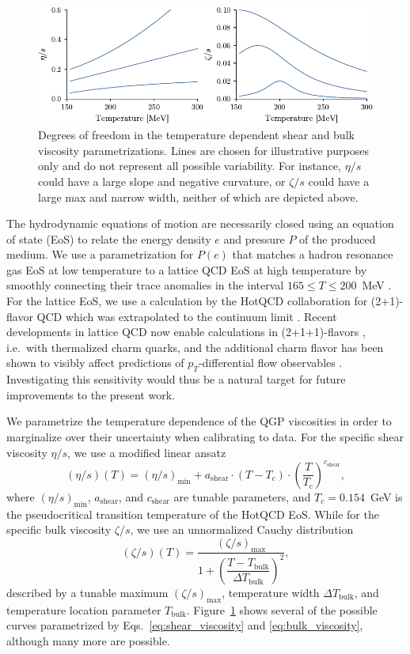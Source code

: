 \documentclass[aps,prc,reprint,amsmath,nofootinbib]{revtex4-1}
\newcommand{\smin}{{(\eta/s)_\mathrm{min}}}
\newcommand{\sslope}{{a_\mathrm{shear}}}
\newcommand{\scrv}{{c_\mathrm{shear}}}
\newcommand{\bmax}{{(\zeta/s)_\mathrm{max}}}
\newcommand{\bloc}{{T_\text{bulk}}}
\newcommand{\bwidth}{{\Delta T_\text{bulk}}}
\begin{document}
\begin{figure}[t]
  \includegraphics{viscosity_dof}
  \caption{Degrees of freedom in the temperature dependent shear and bulk viscosity parametrizations. Lines are chosen for illustrative purposes only and do not represent all possible variability. For instance, $\eta/s$ could have a large slope and negative curvature, or $\zeta/s$ could have a large max and narrow width, neither of which are depicted above.}
  \label{fig:viscosity_dof}
\end{figure}

The hydrodynamic equations of motion are necessarily closed using an equation of state (EoS) to relate the energy density $e$ and pressure $P$ of the produced medium.
We use a parametrization for $P(e)$ that matches a hadron resonance gas EoS at low temperature to a lattice QCD EoS at high temperature by smoothly connecting their trace anomalies in the interval
$165 \le T \le 200$~MeV \cite{Bernhard:2018hnz}.
For the lattice EoS, we use a calculation by the HotQCD collaboration for (2+1)-flavor QCD which was extrapolated to the continuum limit \cite{Bazavov:2014pvz}. Recent developments in lattice QCD now enable calculations in (2+1+1)-flavors \cite{Borsanyi:2016ksw}, i.e.\ with thermalized charm quarks, and the additional charm flavor has been shown to visibly affect predictions of $p_T$-differential flow observables \cite{Noronha-Hostler:2018zxc}.
Investigating this sensitivity would thus be a natural target for future improvements to the present work.

We parametrize the temperature dependence of the QGP viscosities in order to marginalize over their uncertainty when calibrating to data.
For the specific shear viscosity $\eta/s$, we use a modified linear ansatz
\begin{equation}
  \label{eq:shear_viscosity}
  (\eta/s)(T) = \smin + \sslope \cdot(T - T_c)\cdot \left ( \frac{T}{T_c} \right)^\scrv,
\end{equation}
where $\smin$, $\sslope$, and $\scrv$ are tunable parameters, and $T_c=0.154$~GeV is the pseudocritical transition temperature of the HotQCD EoS.
While for the specific bulk viscosity $\zeta/s$, we use an unnormalized Cauchy distribution
\begin{equation}
  \label{eq:bulk_viscosity}
  (\zeta/s)(T) = \frac{\bmax}{1 + \left(\dfrac{T - \bloc}{\bwidth}\right)^2},
\end{equation}
described by a tunable maximum $\bmax$, temperature width $\bwidth$, and temperature location parameter $\bloc$.
Figure~\ref{fig:viscosity_dof} shows several of the possible curves parametrized by Eqs.~\eqref{eq:shear_viscosity} and \eqref{eq:bulk_viscosity}, although many more are possible.
\end{document}
